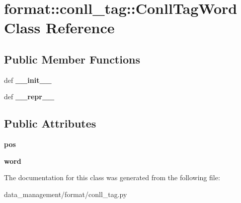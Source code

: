 \hypertarget{classformat_1_1conll__tag_1_1ConllTagWord}{
\section{format::conll\_\-tag::ConllTagWord Class Reference}
\label{classformat_1_1conll__tag_1_1ConllTagWord}
}
\subsection*{Public Member Functions}
\begin{DoxyCompactItemize}
\item 
\hypertarget{classformat_1_1conll__tag_1_1ConllTagWord_a20aa0c59452062341e173d2c7b7767a4}{
def {\bfseries \_\-\_\-init\_\-\_\-}}
\label{classformat_1_1conll__tag_1_1ConllTagWord_a20aa0c59452062341e173d2c7b7767a4}

\item 
\hypertarget{classformat_1_1conll__tag_1_1ConllTagWord_a1c175a19230cf99cf75b05e17b52ab51}{
def {\bfseries \_\-\_\-repr\_\-\_\-}}
\label{classformat_1_1conll__tag_1_1ConllTagWord_a1c175a19230cf99cf75b05e17b52ab51}

\end{DoxyCompactItemize}
\subsection*{Public Attributes}
\begin{DoxyCompactItemize}
\item 
\hypertarget{classformat_1_1conll__tag_1_1ConllTagWord_a6471b1d9f811ae6638fe3a4a7e8f8500}{
{\bfseries pos}}
\label{classformat_1_1conll__tag_1_1ConllTagWord_a6471b1d9f811ae6638fe3a4a7e8f8500}

\item 
\hypertarget{classformat_1_1conll__tag_1_1ConllTagWord_aa80dd4140490c38f93a4336e6116e111}{
{\bfseries word}}
\label{classformat_1_1conll__tag_1_1ConllTagWord_aa80dd4140490c38f93a4336e6116e111}

\end{DoxyCompactItemize}


The documentation for this class was generated from the following file:\begin{DoxyCompactItemize}
\item 
data\_\-management/format/conll\_\-tag.py\end{DoxyCompactItemize}
